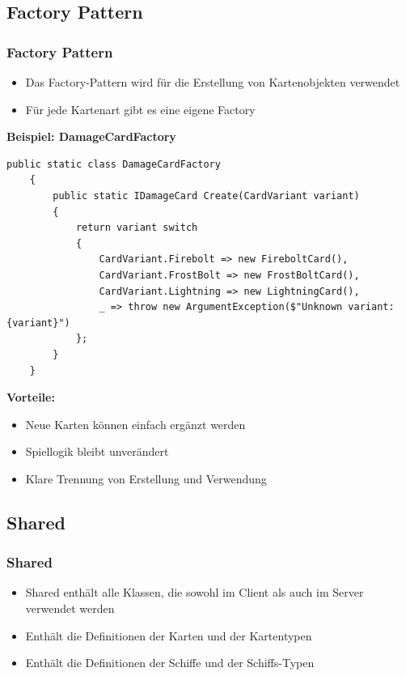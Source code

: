 \documentclass{beamer}
\begin{document}
\subsection{Factory Pattern}
\begin{frame}[fragile]
\frametitle{Factory Pattern}
  \begin{itemize}
    \item Das Factory-Pattern wird für die Erstellung von Kartenobjekten verwendet
    \item Für jede Kartenart gibt es eine eigene Factory
  \end{itemize}
  
  \textbf{Beispiel: DamageCardFactory}
  \begin{lstlisting}[language=CSharp, basicstyle=\ttfamily\tiny, breaklines=true]
    public static class DamageCardFactory 
    {
        public static IDamageCard Create(CardVariant variant) 
        {
            return variant switch 
            {
                CardVariant.Firebolt => new FireboltCard(),
                CardVariant.FrostBolt => new FrostBoltCard(),
                CardVariant.Lightning => new LightningCard(),
                _ => throw new ArgumentException($"Unknown variant: {variant}")
            };
        }
    }
  \end{lstlisting}
  
  \textbf{Vorteile:}
  \begin{itemize}
    \item Neue Karten können einfach ergänzt werden
    \item Spiellogik bleibt unverändert
    \item Klare Trennung von Erstellung und Verwendung
  \end{itemize}
\end{frame}

\subsection{Shared}
\begin{frame}
\frametitle{Shared}
  \begin{itemize}
    \item Shared enthält alle Klassen, die sowohl im Client als auch im Server verwendet werden
    \item Enthält die Definitionen der Karten und der Kartentypen
    \item Enthält die Definitionen der Schiffe und der Schiffs-Typen
  \end{itemize}
\end{frame}
\end{document}
